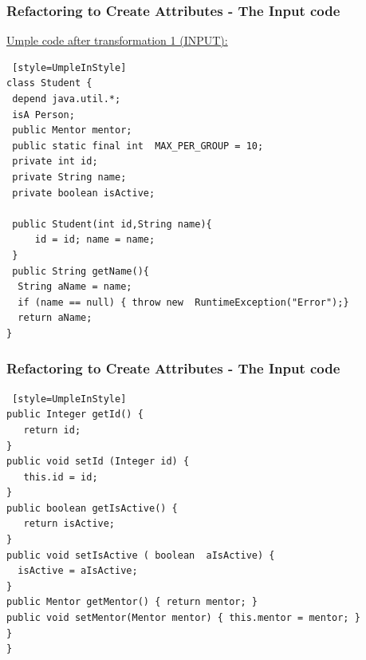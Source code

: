 \documentclass[xcolor=table]{beamer}
\begin{document}
\begin{frame}[fragile] %
\frametitle{Refactoring to Create Attributes - The Input code}
\underline{Umple code after transformation 1 (INPUT): }

\begin{lstlisting} [style=UmpleInStyle]
class Student { 
 depend java.util.*;
 isA Person;
 public Mentor mentor; 
 public static final int  MAX_PER_GROUP = 10;
 private int id;
 private String name; 
 private boolean isActive;
 
 public Student(int id,String name){
     id = id; name = name;
 }
 public String getName(){ 
  String aName = name;
  if (name == null) { throw new  RuntimeException("Error");} 
  return aName;
}  
\end{lstlisting}
\end{frame}

\begin{frame}[fragile] %
\frametitle{Refactoring to Create Attributes - The Input code}

\begin{lstlisting} [style=UmpleInStyle]
public Integer getId() { 
   return id; 
} 
public void setId (Integer id) {    
   this.id = id;
}	
public boolean getIsActive() { 
   return isActive;
}
public void setIsActive ( boolean  aIsActive) {
  isActive = aIsActive;
}
public Mentor getMentor() { return mentor; } 
public void setMentor(Mentor mentor) { this.mentor = mentor; } 
}
} 
\end{lstlisting}
\end{frame}
\end{document}
